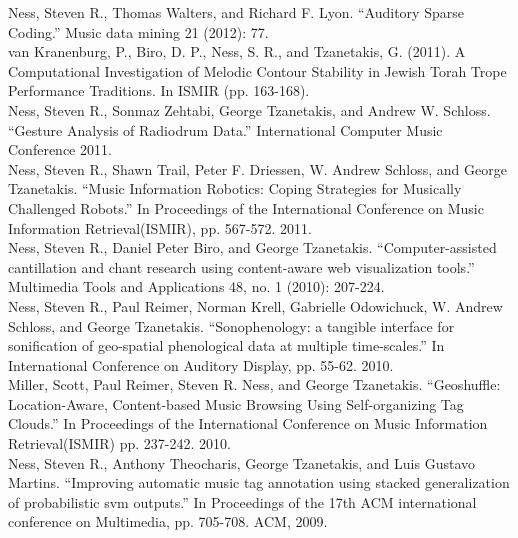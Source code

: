 \documentclass[12pt,oneside]{book}
\begin{document}
\cite{ness2010sparse}
Ness, Steven R., Thomas Walters, and Richard F. Lyon. ``Auditory
Sparse Coding.'' Music data mining 21 (2012): 77.
\\

\cite{van2011computational}
van Kranenburg, P., Biro, D. P., Ness, S. R., and Tzanetakis,
G. (2011). A Computational Investigation of Melodic Contour Stability
in Jewish Torah Trope Performance Traditions. In ISMIR (pp. 163-168).
\\

\cite{ness2011gesture}
Ness, Steven R., Sonmaz Zehtabi, George Tzanetakis, and Andrew
W. Schloss. ``Gesture Analysis of Radiodrum Data.'' International
Computer Music Conference 2011.
\\

\cite{ness2011music} Ness, Steven R., Shawn Trail, Peter F. Driessen,
W. Andrew Schloss, and George Tzanetakis. ``Music Information
Robotics: Coping Strategies for Musically Challenged Robots.'' In
Proceedings of the International Conference on Music Information
Retrieval(ISMIR), pp. 567-572. 2011.  
\\

\cite{ness2010computer}
Ness, Steven R., Daniel Peter Biro, and George
Tzanetakis. ``Computer-assisted cantillation and chant research using
content-aware web visualization tools.'' Multimedia Tools and
Applications 48, no. 1 (2010): 207-224.
\\

\cite{ness2010sonophenology}
Ness, Steven R., Paul Reimer, Norman Krell, Gabrielle Odowichuck,
W. Andrew Schloss, and George Tzanetakis. ``Sonophenology: a tangible
interface for sonification of geo-spatial phenological data at
multiple time-scales.'' In International Conference on Auditory
Display, pp. 55-62. 2010.
\\

\cite{miller2010geoshuffle}
Miller, Scott, Paul Reimer, Steven R. Ness, and George
Tzanetakis. ``Geoshuffle: Location-Aware, Content-based Music Browsing
Using Self-organizing Tag Clouds.'' In Proceedings of the
International Conference on Music Information Retrieval(ISMIR)
pp. 237-242. 2010.  
\\

\cite{ness2009improving}
Ness, Steven R., Anthony Theocharis, George Tzanetakis, and Luis
Gustavo Martins. ``Improving automatic music tag annotation using
stacked generalization of probabilistic svm outputs.'' In Proceedings
of the 17th ACM international conference on Multimedia,
pp. 705-708. ACM, 2009.
\\
\end{document}
